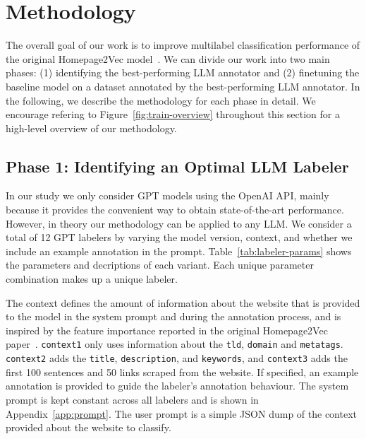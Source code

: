 \section{Methodology}\label{sec:methodology}

The overall goal of our work is to improve multilabel classification performance of the original Homepage2Vec model~\cite{homepage2vec}. We can divide our work into two main phases: (1) identifying the best-performing LLM annotator and (2) finetuning the baseline model on a dataset annotated by the best-performing LLM annotator. In the following, we describe the methodology for each phase in detail. We encourage refering to Figure~\ref{fig:train-overview} throughout this section for a high-level overview of our methodology.

\subsection*{Phase 1: Identifying an Optimal LLM Labeler}



In our study we only consider GPT models using the OpenAI API, mainly because it provides the convenient way to obtain state-of-the-art performance. However, in theory our methodology can be applied to any LLM. We consider a total of 12 GPT labelers by varying the model version, context, and whether we include an example annotation in the prompt. Table~\ref{tab:labeler-params} shows the parameters and decriptions of each variant. Each unique parameter combination makes up a unique labeler.

The context defines the amount of information about the website that is provided to the model in the system prompt and during the annotation process, and is inspired by the feature importance reported in the original Homepage2Vec paper~\cite{homepage2vec}. \texttt{context1} only uses information about the \texttt{tld}, \texttt{domain} and \texttt{metatags}. \texttt{context2} adds the \texttt{title}, \texttt{description}, and \texttt{keywords}, and \texttt{context3} adds the first 100 sentences and 50 links scraped from the website. If specified, an example annotation is provided to guide the labeler's annotation behaviour. The system prompt is kept constant across all labelers and is shown in Appendix~\ref{app:prompt}. The user prompt is a simple JSON dump of the context provided about the website to classify.

